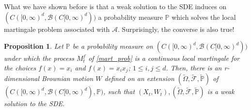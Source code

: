 \documentclass{article}
\newtheorem{prop}{Proposition}
\begin{document}
What we have shown before is that a weak solution to the SDE induces on $(C([0,\infty)^d,\mathcal{B}(C[0,\infty)^d))$ a probability measure $\mathbb{P}$ which solves the local martingale problem associated with $\mathcal{A}$. Surprisingly, the converse is also true!

\begin{prop}
Let $\mathbb{P}$ be a probability measure on $(C([0,\infty)^d,\mathcal{B}(C[0,\infty)^d))$ under which the process $M_t^f$ of \eqref{mart_prob} is a continuous local martingale for the choices $f(x)=x_i$ and $f(x)=x_ix_j$; $1\leq i,j\leq d$. Then, there is an r-dimensional Brownian motion $W$ defined on an extension $(\tilde{\Omega},\tilde{\mathcal{F}},\tilde{\mathbb{P}})$ of $(C([0,\infty)^d,\mathcal{B}(C[0,\infty)^d),\mathbb{P})$, such that $(X_t,W_t),(\tilde{\Omega},\tilde{\mathcal{F}},\tilde{\mathbb{P}})$ is a weak solution to the SDE.
\end{prop}
\end{document}

